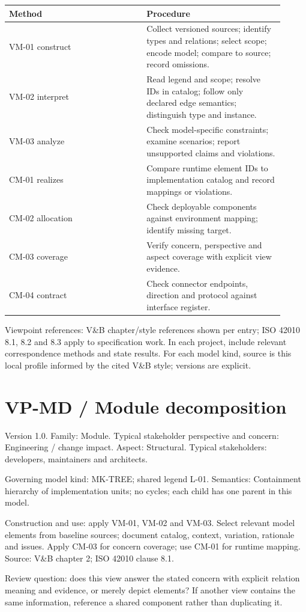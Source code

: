 \documentclass[11pt,letterpaper]{article}
\newcommand{\docsection}[1]{\Needspace{5\baselineskip}\section{#1}}
\begin{document}
\begin{longtable}{@{}>{\RaggedRight\arraybackslash}p{0.457\linewidth}>{\RaggedRight\arraybackslash}p{0.457\linewidth}@{}}
\toprule
\textbf{Method} & \textbf{Procedure}\\\midrule
\endhead
VM-01 construct & Collect versioned sources; identify types and relations; select scope; encode model; compare to source; record omissions.\\
VM-02 interpret & Read legend and scope; resolve IDs in catalog; follow only declared edge semantics; distinguish type and instance.\\
VM-03 analyze & Check model-specific constraints; examine scenarios; report unsupported claims and violations.\\
CM-01 realizes & Compare runtime element IDs to implementation catalog and record mappings or violations.\\
CM-02 allocation & Check deployable components against environment mapping; identify missing target.\\
CM-03 coverage & Verify concern, perspective and aspect coverage with explicit view evidence.\\
CM-04 contract & Check connector endpoints, direction and protocol against interface register.\\
\bottomrule
\end{longtable}
Viewpoint references: V\&B chapter/style references shown per entry; ISO 42010 8.1, 8.2 and 8.3 apply to specification work. In each project, include relevant correspondence methods and state results. For each model kind, source is this local profile informed by the cited V\&B style; versions are explicit.

\docsection{VP-MD / Module decomposition}
Version 1.0. Family: Module. Typical stakeholder perspective and concern: Engineering / change impact. Aspect: Structural. Typical stakeholders: developers, maintainers and architects.

Governing model kind: MK-TREE; shared legend L-01. Semantics: Containment hierarchy of implementation units; no cycles; each child has one parent in this model.

Construction and use: apply VM-01, VM-02 and VM-03. Select relevant model elements from baseline sources; document catalog, context, variation, rationale and issues. Apply CM-03 for concern coverage; use CM-01 for runtime mapping. Source: V\&B chapter 2; ISO 42010 clause 8.1.

Review question: does this view answer the stated concern with explicit relation meaning and evidence, or merely depict elements? If another view contains the same information, reference a shared component rather than duplicating it.
\end{document}
